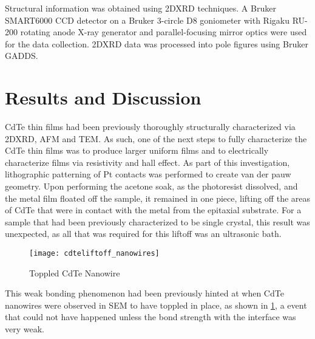Structural information was obtained using 2DXRD techniques. A Bruker SMART6000 CCD 
detector on a Bruker 3-circle D8 goniometer with Rigaku RU-200 rotating anode X-ray 
generator and parallel-focusing mirror optics were used for the data collection. 2DXRD 
data was processed into pole figures using Bruker GADDS.
\section{Results and Discussion}
CdTe thin films had been previously thoroughly structurally characterized via 2DXRD, AFM 
and TEM. As such, one of the next steps to fully characterize the CdTe thin films was to 
produce larger uniform films\cite{stephen-thesis} and to electrically characterize films 
via resistivity and hall effect. As part of this investigation, lithographic patterning 
of Pt contacts was performed to create van der pauw geometry. Upon performing the acetone 
soak, as the photoresist dissolved, and the metal film floated off the sample, it 
remained in one piece, lifting off the areas of CdTe that were in contact with the metal from the epitaxial substrate. 
For a sample that had been previously characterized to be single crystal, this result was 
unexpected, as all that was required for this liftoff was an ultrasonic bath.
\begin{figure}
    \centering
    \texttt{[image: cdteliftoff\_nanowires]}
    \caption{\label{fig:cdteliftoff_nanowires}Toppled CdTe Nanowire}
\end{figure}
This weak bonding phenomenon had been previously hinted at when CdTe nanowires were 
observed in SEM to have toppled in place, as shown in \cref{fig:cdteliftoff_nanowires}, a 
event that could not have happened unless the bond strength with the interface was very 
weak.

